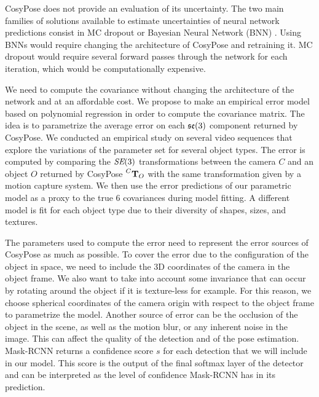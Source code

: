 CosyPose does not provide an evaluation of its uncertainty.
%
The two main families of solutions available to estimate uncertainties of neural network predictions consist in MC dropout \cite{gal2016dropout} 
or Bayesian Neural Network (BNN) \cite{jospin2020hands}. Using BNNs would require changing the architecture of CosyPose and retraining it. 
MC dropout would require several forward passes through the network for each iteration, which would be computationally expensive. 

We need to compute the covariance without changing the architecture of the network and at an affordable cost. 
We propose to make an empirical error model based on polynomial regression in order to compute the covariance matrix. 
The idea is to parametrize the average error on each ${\mathfrak {se}}(3)$ component returned by CosyPose. We conducted an empirical study on several video 
sequences that explore the variations of the parameter set for several object types. The error is computed by comparing the $\textit{SE}(3)$ transformations 
between the camera $C$ and an object $O$ returned by CosyPose $\prescript{C}{}{{\bf T}}_{O}$ with the same transformation given by a motion capture system. 
We then use the error predictions of our parametric model as a proxy to the true 6 covariances during model fitting. 
A different model is fit for each object type due to their diversity of shapes, sizes, and textures.

The parameters used to compute the error need to represent the error sources of CosyPose as much as possible. 
To cover the error due to the configuration of the object in space, we need to include the 3D coordinates of the camera in the object frame. 
We also want to take into account some invariance that can occur by rotating around the object if it is texture-less for example. 
For this reason, we choose spherical coordinates of the camera origin with respect to the object frame to parametrize the model. 
Another source of error can be the occlusion of the object in the scene, as well as the motion blur, or any inherent noise in the image. 
This can affect the quality of the detection and of the pose estimation. Mask-RCNN returns a confidence score $s$ for each detection 
that we will include in our model. This score is the output of the final softmax layer of the detector and can be interpreted
as the level of confidence Mask-RCNN has in its prediction.


